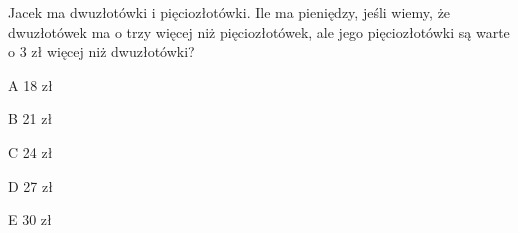\begin{tresc}
Jacek ma dwuzłotówki i pięciozłotówki. Ile ma pieniędzy, jeśli wiemy, że dwuzłotówek ma o trzy więcej niż pięciozłotówek, ale jego pięciozłotówki są warte o 3 zł więcej niż dwuzłotówki?
\end{tresc}
\begin{wariant}{A} 18 zł \end{wariant}
\begin{wariant}{B} 21 zł \end{wariant}
\begin{wariant}{C} 24 zł \end{wariant}
\begin{wariant}{D} 27 zł \end{wariant}
\begin{wariant}{E} 30 zł \end{wariant}
